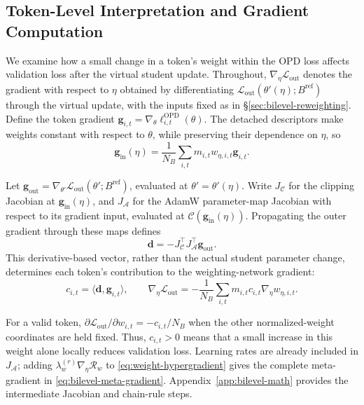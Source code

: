 \documentclass{article}
\theoremstyle{plain}
\theoremstyle{definition}
\theoremstyle{remark}
\begin{document}
\subsection{Token-Level Interpretation and Gradient Computation}
\label{sec:token-credit}

We examine how a small change in a token's weight within the OPD loss affects validation loss after the virtual student update. Throughout, \(\nabla_\eta\mathcal L_{\mathrm{out}}\) denotes the gradient with respect to \(\eta\) obtained by differentiating \(\mathcal L_{\mathrm{out}}(\theta'(\eta);B^{\mathrm{ref}})\) through the virtual update, with the inputs fixed as in \S\ref{sec:bilevel-reweighting}.
Define the token gradient \(\boldsymbol g_{i,t}=\nabla_\theta\ell^{\mathrm{OPD}}_{i,t}(\theta)\). The detached descriptors make weights constant with respect to \(\theta\), while preserving their dependence on \(\eta\), so
\begin{equation}
    \boldsymbol g_{\mathrm{in}}(\eta)
    =\frac{1}{N_B}\sum_{i,t}m_{i,t}w_{\eta,i,t}\boldsymbol g_{i,t}.
    \label{eq:inner-gradient-dependence}
\end{equation}

Let \(\boldsymbol g_{\mathrm{out}}=\nabla_{\theta'}\mathcal L_{\mathrm{out}}(\theta';B^{\mathrm{ref}})\), evaluated at \(\theta'=\theta'(\eta)\).
Write \(J_{\mathcal C}\) for the clipping Jacobian at \(\boldsymbol g_{\mathrm{in}}(\eta)\), and \(J_{\mathcal A}\) for the AdamW parameter-map Jacobian with respect to its gradient input, evaluated at \(\mathcal C(\boldsymbol g_{\mathrm{in}}(\eta))\). Propagating the outer gradient through these maps defines
\begin{equation}
    \boldsymbol d=-J_{\mathcal C}^{\top}J_{\mathcal A}^{\top}\boldsymbol g_{\mathrm{out}}.
    \label{eq:optimizer-aware-direction}
\end{equation}
This derivative-based vector, rather than the actual student parameter change, determines each token's contribution to the weighting-network gradient:
\begin{equation}
    c_{i,t}=\langle\boldsymbol d,\boldsymbol g_{i,t}\rangle,
    \qquad
    \nabla_\eta\mathcal L_{\mathrm{out}}
    =-\frac{1}{N_B}\sum_{i,t}m_{i,t}c_{i,t}\nabla_\eta w_{\eta,i,t}.
    \label{eq:weight-hypergradient}
\end{equation}

For a valid token, \(\partial\mathcal L_{\mathrm{out}}/\partial w_{i,t}=-c_{i,t}/N_B\) when the other normalized-weight coordinates are held fixed. Thus, \(c_{i,t}>0\) means that a small increase in this weight alone locally reduces validation loss.
Learning rates are already included in \(J_{\mathcal A}\); adding \(\lambda_w^{(r)}\nabla_\eta\mathcal R_w\) to \cref{eq:weight-hypergradient} gives the complete meta-gradient in \cref{eq:bilevel-meta-gradient}. Appendix~\ref{app:bilevel-math} provides the intermediate Jacobian and chain-rule steps.
\end{document}
